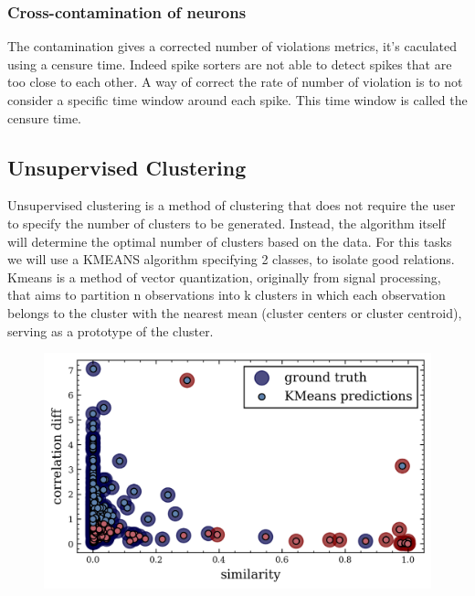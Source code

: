 \documentclass[11pt,a4paper]{report}
\begin{document}
\begin{multicols}{2}
    \subsubsection{Cross-contamination of neurons}

    The contamination \cite{Contamination} gives a corrected number of violations metrics, it's caculated using a censure time. Indeed spike sorters are not able to detect spikes that are too close to each other. A way of correct the rate of number of violation is to not consider a specific time window around each spike. This time window is called the censure time.


    \subsection{Unsupervised Clustering}

    Unsupervised clustering is a method of clustering that does not require the user to specify the number of clusters to be generated. Instead, the algorithm itself will determine the optimal number of clusters based on the data.
    For this tasks we will use a KMEANS algorithm specifying 2 classes, to isolate good relations. Kmeans is a method of vector quantization, originally from signal processing, that aims to partition n observations into k clusters in which each observation belongs to the cluster with the nearest mean (cluster centers or cluster centroid), serving as a prototype of the cluster.

    \begin{figure}[H]
        \centering
        \includegraphics[width=\linewidth]{./figure/param_space_km.png}
    \end{figure}


\end{multicols}
\end{document}
